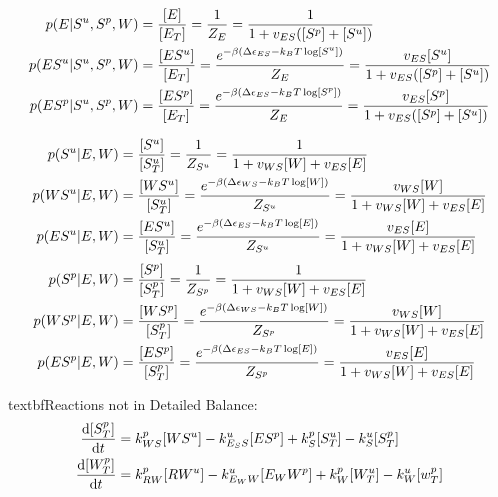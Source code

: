 \documentclass[aps,onecolumn,superscriptaddress,notitlepage]{revtex4-1}
\begin{document}
\begin{align}
p(E|S^u,S^p, W) &= \frac{[E]}{[E_T]} = \frac{1}{Z_E} =  \frac{1}{1 + v_{ES}([S^p]+[S^u])}\\
p(ES^u|S^u,S^p, W) &= \frac{[ES^u]}{[E_T]}  = \frac{e^{-\beta\qty(\Delta\epsilon_{ES} -k_BT \log[S^u])}}{Z_E} =  \frac{v_{ES}[S^u]}{1 + v_{ES}([S^p]+[S^u])}\\
p(ES^p|S^u,S^p, W) &= \frac{[ES^p]}{[E_T]}  = \frac{e^{-\beta\qty(\Delta\epsilon_{ES} -k_BT \log[S^p])}}{Z_E} =  \frac{v_{ES}[S^p]}{1 + v_{ES}([S^p]+[S^u])}
\end{align}

\begin{align}
p(S^u|E, W) &= \frac{[S^u]}{[S^u_T]} = \frac{1}{Z_{S^u}} = \frac{1}{1 + v_{WS}[W]+ v_{ES}[E]}\\
p(WS^u|E, W) &= \frac{[WS^u]}{[S^u_T]} = \frac{ e^{-\beta\qty(\Delta\epsilon_{WS} -k_BT \log[W])}}{Z_{S^u}} = \frac{v_{WS}[W]}{1 + v_{WS}[W]+ v_{ES}[E]}\\
p(ES^u|E, W) &= \frac{[ES^u]}{[S^u_T]} = \frac{ e^{-\beta\qty(\Delta\epsilon_{ES} -k_BT \log[E])}}{Z_{S^u}} = \frac{v_{ES}[E]}{1 + v_{WS}[W]+ v_{ES}[E]}
\end{align}
\begin{align}
p(S^p|E, W) &= \frac{[S^p]}{[S^p_T]} = \frac{1}{Z_{S^p}} = \frac{1}{1 + v_{WS}[W]+ v_{ES}[E]}\\
p(WS^p|E, W) &= \frac{[WS^p]}{[S^p_T]} = \frac{ e^{-\beta\qty(\Delta\epsilon_{WS} -k_BT \log[W])}}{Z_{S^p}} = \frac{v_{WS}[W]}{1 + v_{WS}[W]+ v_{ES}[E]}\\
p(ES^p|E, W) &= \frac{[ES^p]}{[S^p_T]} = \frac{ e^{-\beta\qty(\Delta\epsilon_{ES} -k_BT \log[E])}}{Z_{S^p}} = \frac{v_{ES}[E]}{1 + v_{WS}[W]+ v_{ES}[E]}
\end{align}


textbf{Reactions not in  Detailed Balance:}
\begin{align}
\dv{[S^p_T]}{t} &= k_{WS}^p[WS^u] - k_{E_SS}^u[ES^p] + k_S^p[S^u_T] - k_S^u[S^p_T]\\
\dv{[W^p_T]}{t} &= k_{RW}^p[RW^u] - k_{E_WW}^u[E_WW^p] + k_W^p[W^u_T] - k_W^u[w^p_T]
\end{align}


\end{document}
